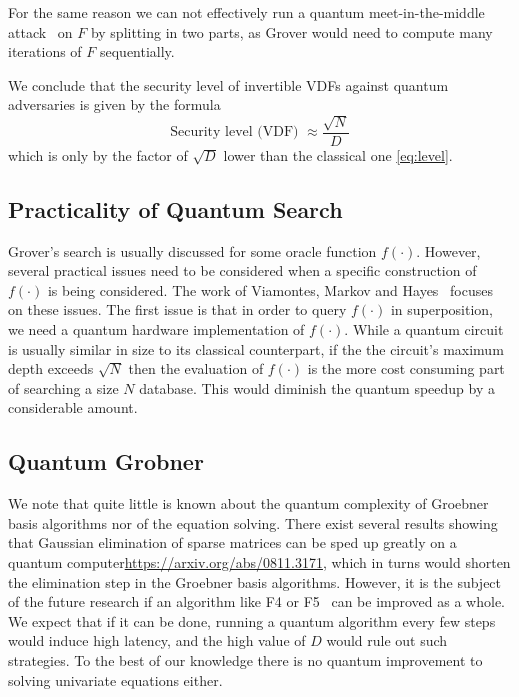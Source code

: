 For the same reason we can not effectively run a quantum meet-in-the-middle attack~\cite{DBLP:journals/sigact/BrassardHT97} on $F$ by splitting in two parts, as Grover would need to compute many iterations of $F$ sequentially.

We conclude that the security level of invertible VDFs against quantum adversaries is given by the formula
 \begin{equation}\label{eq:level2}
     \text{Security level (VDF) }\approx {\frac{\sqrt{N}}{D}} \end{equation}
which is only by the factor of $\sqrt{D}$ lower than the classical one \eqref{eq:level}.


\subsection{Practicality of Quantum Search}

Grover's search is usually discussed for some oracle function $f(\cdot)$. However, several practical issues need to be considered when a specific construction of $f(\cdot)$ is being considered. The work of Viamontes, Markov and Hayes~\cite{practicalityGrover05} focuses on these issues.  The first issue is that in order to query $f(\cdot)$ in superposition, we need a quantum hardware implementation of  $f(\cdot)$. While a quantum circuit is usually similar in size to its classical counterpart, if the the circuit's maximum depth exceeds $\sqrt{N}$ then the evaluation of  $f(\cdot)$ is the more cost consuming part of searching a size $N$ database. This would diminish the quantum speedup by a considerable amount.


\subsection{Quantum Grobner}

We note that quite little is known about the quantum complexity of Groebner basis algorithms nor of the equation solving. There exist several results showing that Gaussian elimination of sparse matrices can be sped up greatly on a quantum computer\url{https://arxiv.org/abs/0811.3171}, which in turns would shorten the elimination step in the Groebner basis algorithms. However, it is the subject of the future research if an algorithm like F4 or F5~\cite{faugere2002new} can be improved as a whole. We expect that if it can be done, running a quantum algorithm every few steps would induce high latency, and the high value of $D$ would rule out such strategies. To the best of our knowledge there is no quantum improvement to solving univariate equations either.
 
 